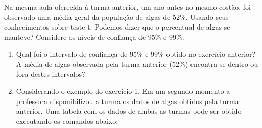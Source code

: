 \documentclass[14pt,titlepage, oneside, openany, a4paper]{book}
\begin{document}
Na mesma aula oferecida à turma anterior, um ano antes no mesmo costão, foi observado uma média geral da população de algas de 52\%.
Usando seus conhecimentos sobre teste-t. Podemos dizer que o percentual de algas se manteve? Considere os níveis de confiança de 95\% e 99\%.

\begin{enumerate}
\def\labelenumi{\arabic{enumi})}
\setcounter{enumi}{1}
\item
  Qual foi o intervalo de confiança de 95\% e 99\% obtido no exercício anterior? A média de algas observada pela turma anterior (52\%) encontra-se dentro ou fora destes intervalos?
\item
  Considerando o exemplo do exercício 1. Em um segundo momento a professora disponibilizou a turma os dados de algas obtidos pela turma anterior.
  Uma tabela com os dados de ambas as turmas pode ser obtido executando os comandos abaixo:
\end{enumerate}
\end{document}
